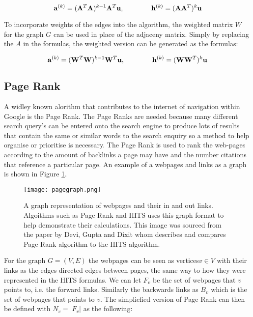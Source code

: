 \begin{equation} \label{eq:nhits}
\bold{a}^{(k)} = (\bold{A}^{T}\bold{A})^{k-1}\bold{A}^{T}\bold{u} , \qquad \qquad \bold{h}^{(k)} = (\bold{A}\bold{A}^{T})^{k}\bold{u}
\end{equation}

To incorporate weights of the edges into the algorithm, the weighted matrix $W$ for the graph $G$ can be used in place of the adjaceny matrix. Simply by replacing the $A$ in the formulas, the weighted version can be generated as the formulas:

\begin{equation} \label{eq:nhits}
\bold{a}^{(k)} = (\bold{W}^{T}\bold{W})^{k-1}\bold{W}^{T}\bold{u} , \qquad \qquad \bold{h}^{(k)} = (\bold{W}\bold{W}^{T})^{k}\bold{u}
\end{equation}

\subsection{Page Rank}
A widley known alorithm that contributes to the internet of navigation within Google is the Page Rank. The Page Ranks are needed because many different search query's can be entered onto the search engine to produce lots of results that contain the same or similar words to the search enquiry so a method to help organise or prioritise is necessary. The Page Rank is used to rank the web-pages according to the amount of backlinks a page may have and the number citations that reference a particular page. An example of a webpages and links as a graph is shown in Figure \ref{fig:page}.

\begin{figure}[!htb]
	\centering
	\texttt{[image: pagegraph.png]}
	\caption{A graph representation of webpages and their in and out links. Algoithms such as Page Rank and HITS uses this graph format to help demonstrate their calculations. This image was sourced from the paper by Devi, Gupta and Dixit\cite{devi2014comparative} whom describes and compares Page Rank algorithm to the HITS algorithm.}
	\label{fig:page}
\end{figure}

For the graph $G = (V, E)$ the webpages can be seen as vertices$v \in V$ with their links as the edges directed edges between pages, the same way to how they were represented in the HITS formulas. We can let $F_v$ be the set of webpages that $v$ points to, i.e. the forward links. Similarly the backwards links as $B_v$ which is the set of webpages that points to $v$. The simpliefied version of Page Rank\cite{page1999pagerank} can then be defined with $N_v = \left|F_v\right|$ as the following:

